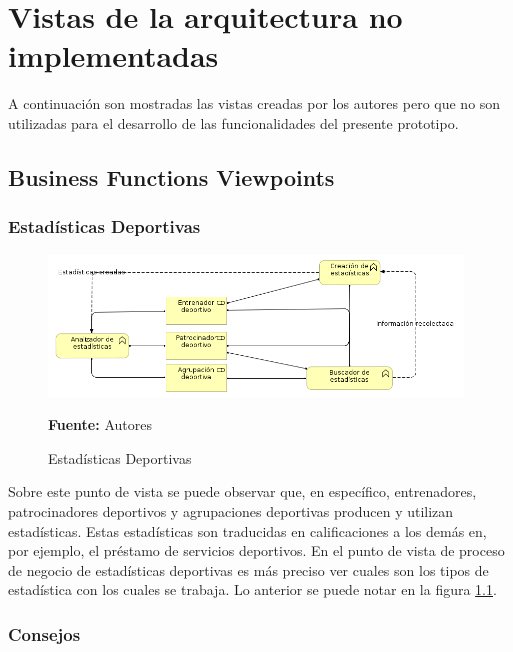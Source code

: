 \chapter{Vistas de la arquitectura no implementadas}
\label{app:vistas_no_implementadas}

A continuación son mostradas las vistas creadas por los autores pero que no son utilizadas para el desarrollo de las funcionalidades del presente prototipo.

\section{Business Functions Viewpoints}

\subsection{Estadísticas Deportivas}

\begin{figure}[!htb]
  \begin{center}
    \includegraphics[width=11cm]{./imagenes/Archimate/vistas/business_functions/estadisticasdeportivas.png}
    \caption{Estadísticas Deportivas}
    \label{fig:bf_estadisticas_deportivas}
    \textbf{Fuente:}  Autores \\
  \end{center}
\end{figure}

Sobre este punto de vista se puede observar que, en específico, entrenadores, patrocinadores deportivos y agrupaciones deportivas producen y utilizan estadísticas. Estas estadísticas son traducidas en calificaciones a los demás en, por ejemplo, el préstamo de servicios deportivos. En el punto de vista de proceso de negocio de estadísticas deportivas es más preciso ver cuales son los tipos de estadística con los cuales se trabaja. Lo anterior se puede notar en la figura \ref{fig:bf_estadisticas_deportivas}.

\subsection{Consejos}

